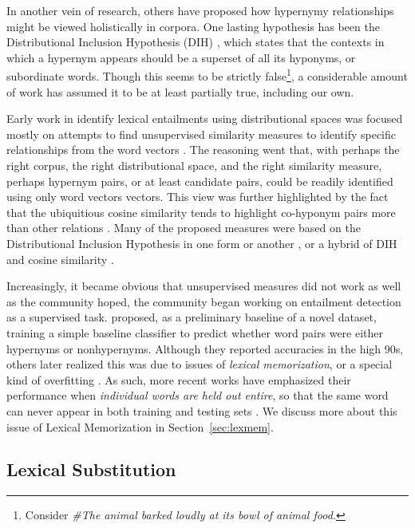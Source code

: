 \documentclass[12pt]{article}
\begin{document}
In another vein of research, others have proposed how
hypernymy relationships might be viewed holistically in corpora.
One lasting hypothesis has been the Distributional Inclusion Hypothesis (DIH)
\cite{zhitomirsky-geffet:2005:acl}, which states that the contexts in which a
hypernym appears should be a superset of all its hyponyms, or subordinate
words. Though this seems to be strictly false\footnote{Consider {\em \#The
animal barked loudly at its bowl of animal food.}}, a considerable amount of
work has assumed it to be at least partially true, including our own.

Early work in identify lexical entailments using distributional spaces was
focused mostly on attempts to find unsupervised similarity measures to identify
specific relationships from the word vectors
\cite{weeds:2004:coling,clarke:2009:gems,kotlerman:2010:nle,lenci:2012:starsem,santus:2013:thesis}.
The reasoning went that, with perhaps the right corpus, the right
distributional space, and the right similarity measure, perhaps hypernym pairs,
or at least candidate pairs, could be readily identified using only word
vectors vectors. This view was further highlighted by the fact that the
ubiquitious cosine similarity tends to highlight co-hyponym pairs more than
other relations \cite{baroni:2011:gems}. Many of the proposed measures were
based on the Distributional Inclusion Hypothesis in one form or another
\cite{clarke:2009:gems}, or a hybrid of DIH and cosine similarity
\cite{kotlerman:2010:nle,lenci:2012:starsem}.

Increasingly, it became obvious that unsupervised measures did not work
as well as the community hoped, the community began working
on entailment detection as a supervised task. 
proposed, as a preliminary baseline of a novel dataset, training a simple
baseline classifier to predict whether word pairs were either hypernyms or
nonhypernyms. Although they reported accuracies in the high 90s, others later
realized this was due to issues of {\em lexical memorization}, or a special
kind of overfitting
\cite{roller:2014:coling,weeds:2014:coling,levy:2015:naacl}. As such, more
recent works have emphasized their performance when {\em individual words are
held out entire}, so that the same word can never appear in both training and
testing sets \cite{roller:2014:coling,kruszewski:2015:tacl,levy:2015:naacl}.
We discuss more about this issue of Lexical Memorization in
Section~\ref{sec:lexmem}.

\subsection{Lexical Substitution}
\label{sec:lexsub}
\end{document}
